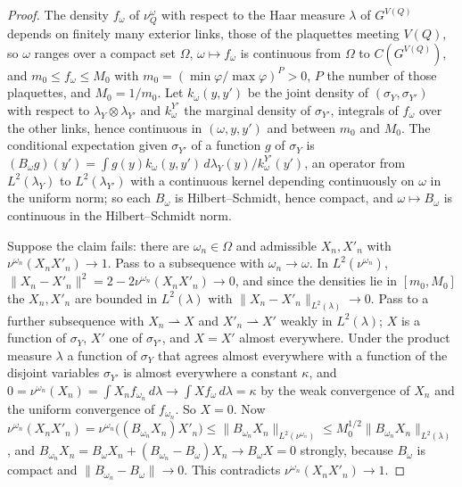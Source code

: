 \begin{proof}
The density $f_\omega$ of $\nu^\omega_Q$ with respect to the Haar measure
$\lambda$ of $G^{V(Q)}$ depends on finitely many exterior links, those of
the plaquettes meeting $V(Q)$, so $\omega$ ranges over a compact set
$\Omega$, $\omega\mapsto f_\omega$ is continuous from $\Omega$ to
$C(G^{V(Q)})$, and $m_0\le f_\omega\le M_0$ with $m_0=(\min\varphi/
\max\varphi)^P>0$, $P$ the number of those plaquettes, and $M_0=1/m_0$. Let
$k_\omega(y,y')$ be the joint density of $(\sigma_Y,\sigma_{Y'})$ with
respect to $\lambda_Y\otimes\lambda_{Y'}$ and $k^{Y'}_\omega$ the marginal
density of $\sigma_{Y'}$, integrals of $f_\omega$ over the other links,
hence continuous in $(\omega,y,y')$ and between $m_0$ and $M_0$. The
conditional expectation given $\sigma_{Y'}$ of a function $g$ of $\sigma_Y$
is $(B_\omega g)(y')=\int g(y)k_\omega(y,y')\,d\lambda_Y(y)/k^{Y'}_\omega(y')$,
an operator from $L^2(\lambda_Y)$ to $L^2(\lambda_{Y'})$ with a continuous
kernel depending continuously on $\omega$ in the uniform norm; so each
$B_\omega$ is Hilbert--Schmidt, hence compact, and $\omega\mapsto B_\omega$
is continuous in the Hilbert--Schmidt norm.

Suppose the claim fails: there are $\omega_n\in\Omega$ and admissible
$X_n,X'_n$ with $\nu^{\omega_n}(X_nX'_n)\to1$. Pass to a subsequence with
$\omega_n\to\omega$. In $L^2(\nu^{\omega_n})$, $\|X_n-X'_n\|^2=2-2\nu^{\omega_n}
(X_nX'_n)\to0$, and since the densities lie in $[m_0,M_0]$ the $X_n,X'_n$ are
bounded in $L^2(\lambda)$ with $\|X_n-X'_n\|_{L^2(\lambda)}\to0$. Pass to a
further subsequence with $X_n\rightharpoonup X$ and $X'_n\rightharpoonup X'$
weakly in $L^2(\lambda)$; $X$ is a function of $\sigma_Y$, $X'$ one of
$\sigma_{Y'}$, and $X=X'$ almost everywhere. Under the product measure
$\lambda$ a function of $\sigma_Y$ that agrees almost everywhere with a
function of the disjoint variables $\sigma_{Y'}$ is almost everywhere a
constant $\kappa$, and $0=\nu^{\omega_n}(X_n)=\int X_nf_{\omega_n}\,d\lambda\to
\int Xf_\omega\,d\lambda=\kappa$ by the weak convergence of $X_n$ and the
uniform convergence of $f_{\omega_n}$. So $X=0$. Now
$\nu^{\omega_n}(X_nX'_n)=\nu^{\omega_n}\bigl((B_{\omega_n}X_n)X'_n\bigr)\le
\|B_{\omega_n}X_n\|_{L^2(\nu^{\omega_n})}\le M_0^{1/2}\|B_{\omega_n}X_n\|_{L^2
(\lambda)}$, and $B_{\omega_n}X_n=B_\omega X_n+(B_{\omega_n}-B_\omega)X_n\to
B_\omega X=0$ strongly, because $B_\omega$ is compact and $\|B_{\omega_n}-
B_\omega\|\to0$. This contradicts $\nu^{\omega_n}(X_nX'_n)\to1$.
\end{proof}

